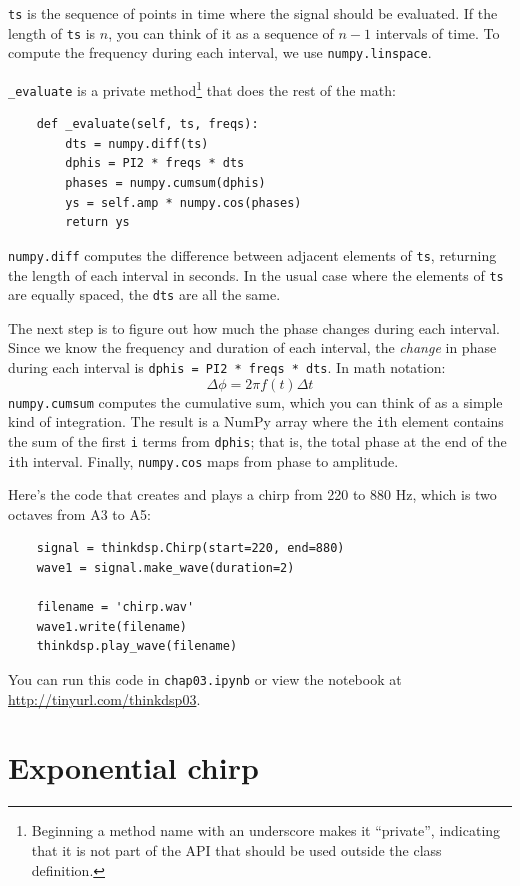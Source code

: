 \documentclass[12pt]{book}
\begin{document}
{\tt ts} is the sequence of points in time where the signal should
be evaluated.  If the length of {\tt ts} is $n$, you can think of
it as a sequence of $n-1$ intervals of time.  To compute the frequency
during each interval, we use {\tt numpy.linspace}.

\verb"_evaluate" is a private method\footnote{Beginning a method name
  with an underscore makes it ``private'', indicating that it is not
  part of the API that should be used outside the class definition.}
that does the rest of the math:

\begin{verbatim}
    def _evaluate(self, ts, freqs):
        dts = numpy.diff(ts)
        dphis = PI2 * freqs * dts
        phases = numpy.cumsum(dphis)
        ys = self.amp * numpy.cos(phases)
        return ys
\end{verbatim}

{\tt numpy.diff} computes the difference between adjacent elements
of {\tt ts}, returning the length of each interval in seconds.  In
the usual case where the elements of {\tt ts} are equally spaced,
the {\tt dts} are all the same.

The next step is to figure out how much the phase changes during
each interval.  Since we know the frequency and duration of each
interval, the {\em change} in phase during each interval is
{\tt dphis = PI2 * freqs * dts}.  In math notation:
%
\[ \Delta \phi = 2 \pi f(t) \Delta t \]
%
{\tt numpy.cumsum} computes the cumulative sum, which you can think
of as a simple kind of integration.  The result is
a NumPy array where the {\tt i}th element contains the sum of
the first {\tt i} terms from {\tt dphis}; that is, the total
phase at the end of the {\tt i}th interval.  Finally, {\tt numpy.cos}
maps from phase to amplitude.

Here's the code that creates and plays a chirp from 220 to 880 Hz, which
is two octaves from A3 to A5:

\begin{verbatim}
    signal = thinkdsp.Chirp(start=220, end=880)
    wave1 = signal.make_wave(duration=2)

    filename = 'chirp.wav'
    wave1.write(filename)
    thinkdsp.play_wave(filename)
\end{verbatim}

You can run this code in {\tt chap03.ipynb} or view the notebook
at \url{http://tinyurl.com/thinkdsp03}.


\section{Exponential chirp}
\end{document}
